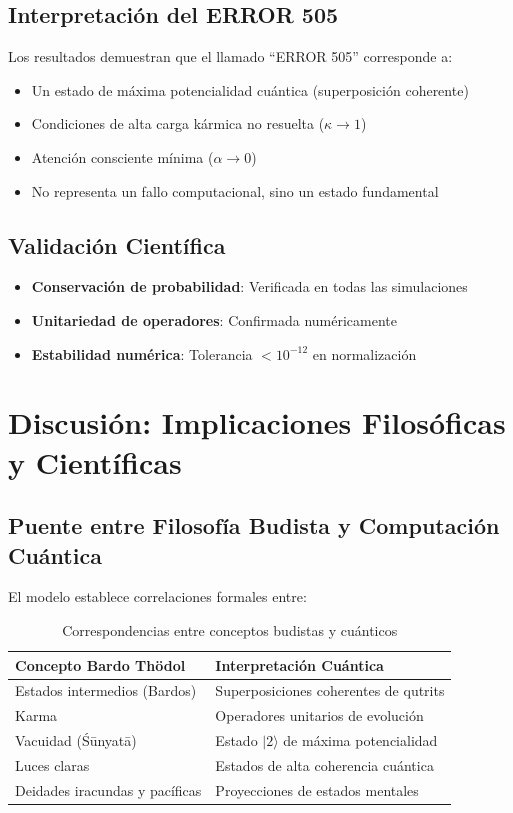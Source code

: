 \documentclass[12pt,a4paper]{article}
\newcommand{\ket}[1]{| #1 \rangle}
\theoremstyle{definition}
\begin{document}
\subsection{Interpretación del ERROR 505}

Los resultados demuestran que el llamado ``ERROR 505'' corresponde a:

\begin{itemize}
    \item Un estado de máxima potencialidad cuántica (superposición coherente)
    \item Condiciones de alta carga kármica no resuelta ($\kappa \to 1$)
    \item Atención consciente mínima ($\alpha \to 0$)
    \item No representa un fallo computacional, sino un estado fundamental
\end{itemize}

\subsection{Validación Científica}

\begin{itemize}
    \item \textbf{Conservación de probabilidad}: Verificada en todas las simulaciones
    \item \textbf{Unitariedad de operadores}: Confirmada numéricamente
    \item \textbf{Estabilidad numérica}: Tolerancia $< 10^{-12}$ en normalización
\end{itemize}

\section{Discusión: Implicaciones Filosóficas y Científicas}

\subsection{Puente entre Filosofía Budista y Computación Cuántica}

El modelo establece correlaciones formales entre:

\begin{table}[htbp]
\centering
\caption{Correspondencias entre conceptos budistas y cuánticos}
\begin{tabular}{lp{}}
\toprule
Concepto Bardo Thödol & Interpretación Cuántica \\
\midrule
Estados intermedios (Bardos) & Superposiciones coherentes de qutrits \\
Karma & Operadores unitarios de evolución \\
Vacuidad (Śūnyatā) & Estado $\ket{2}$ de máxima potencialidad \\
Luces claras & Estados de alta coherencia cuántica \\
Deidades iracundas y pacíficas & Proyecciones de estados mentales \\
\bottomrule
\end{tabular}
\label{tab:correspondences}
\end{table}
\end{document}
